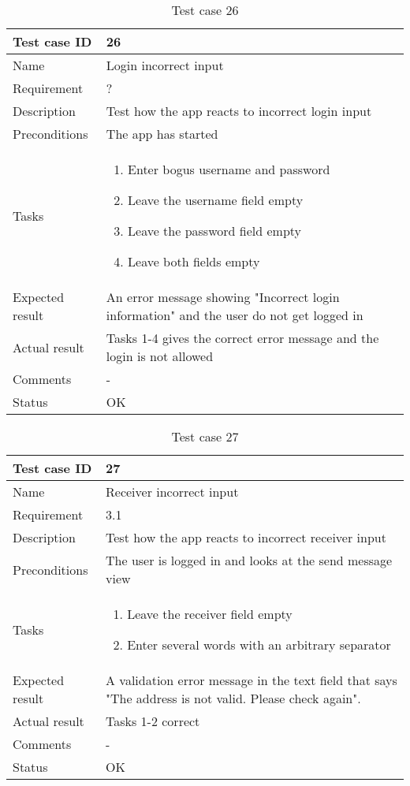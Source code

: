 			\begin{table}
			\begin{tabular}{l|p{10cm}}
				Test case ID & 26\\ \hline
				Name & Login incorrect input\\ \hline
				Requirement & ?\\ \hline
				Description&Test how the app reacts to incorrect login input\\ \hline
				Preconditions&The app has started\\ \hline
				Tasks&\begin{enumerate}
						\item{}Enter bogus username and password
						\item{}Leave the username field empty
						\item{}Leave the password field empty
						\item{}Leave both fields empty
					\end{enumerate} \\ \hline
				Expected result&An error message showing "Incorrect login information" and the user do not get logged in\\ \hline
				Actual result& Tasks 1-4 gives the correct error message and the login is not allowed\\ \hline
				Comments&- \\ \hline
				Status& OK\\ \hline 
			\end{tabular}
			\caption{Test case 26} \label{tab:case26}
			\end{table}

				\begin{table}
			\begin{tabular}{l|p{10cm}}
				Test case ID & 27\\ \hline
				Name & Receiver incorrect input\\ \hline
				Requirement & 3.1\\ \hline
				Description&Test how the app reacts to incorrect receiver input\\ \hline
				Preconditions&The user is logged in and looks at the send message view\\ \hline
				Tasks&\begin{enumerate}
						\item{}Leave the receiver field empty
						\item{}Enter several words with an arbitrary separator
					\end{enumerate} \\ \hline
				Expected result&A validation error message in the text field that says "The address is not valid. Please check again". \\ \hline
				Actual result&Tasks 1-2 correct\\ \hline
				Comments&-\\ \hline
				Status& OK\\ \hline 
			\end{tabular}
			\caption{Test case 27} \label{tab:case27}
			\end{table}

